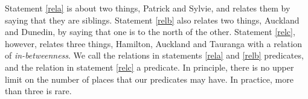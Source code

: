 \documentclass[PHIL101-Textbook.tex]{subfiles}
\begin{document}
\noindent Statement \ref{rela} is about two things, Patrick and Sylvie, and relates them by saying that they are siblings.
Statement \ref{relb} also relates two things, Auckland and Dunedin, by saying that one is to the north of the other.
Statement \ref{relc}, however, relates three things, Hamilton, Auckland and Tauranga with a relation of \emph{in-betweenness}.   
We call the relations in statements \ref{rela} and \ref{relb}  predicates, and the relation in statement \ref{relc} a  predicate.
In principle, there is no upper limit on the number of places that our predicates may have. In practice, more than three is rare.

\end{document}
